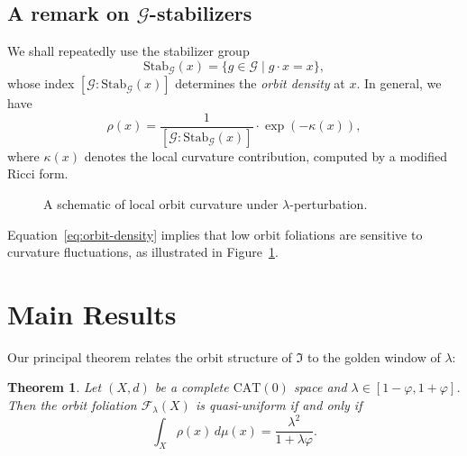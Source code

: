 \documentclass{amsart}
\newtheorem{theorem}{Theorem}[section]
\begin{document}
\subsection{A remark on $\mathcal{G}$-stabilizers}
We %
shall repeatedly use the stabilizer %
group
\[
    \mathrm{Stab}_{\mathcal{G}}(x) = \{ g \in \mathcal{G} \mid g \cdot x = x \},
\]
whose %
index $[\mathcal{G} : \mathrm{Stab}_{\mathcal{G}}(x)]$ determines the \emph{orbit density} at $x$.  
In general, we have
\begin{equation}\label{eq:orbit-density}
    \rho(x) = \frac{1}{[\mathcal{G} : \mathrm{Stab}_{\mathcal{G}}(x)]} \cdot \exp(-\kappa(x)),
\end{equation}
where $\kappa(x)$ denotes the local curvature contribution, computed by a modified Ricci form.

\begin{figure}[htbp]
\centering
{}
\caption{A schematic of local orbit curvature under %
$\lambda$-perturbation.%
}
\label{fig:curvature}
\end{figure}

Equation~\eqref{eq:orbit-density} implies that low orbit foliations are sensitive to curvature fluctuations, as illustrated in Figure~\ref{fig:curvature}. 

\section{Main Results}

Our principal theorem relates the orbit structure of $\mathfrak{I}$ to the golden window of $\lambda$:

\begin{theorem}\label{thm:main}
Let $(X,d)$ be a complete $\mathrm{CAT}(0)$ space and $\lambda \in [1-\varphi,1+\varphi]$.  
Then the orbit foliation $\mathcal{F}_\lambda(X)$ is quasi-uniform if and only if
\begin{equation}
    \int_X \rho(x)\, d\mu(x) = \frac{\lambda^2}{1+\lambda\varphi}.
\end{equation}
\end{theorem}
\end{document}
